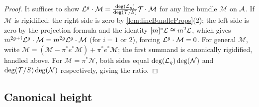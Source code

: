 \begin{proof}
  It suffices to show \(\mathcal{L}^g \cdot \mathcal{M} = \frac{\deg(\mathcal{L}_\eta)}{\deg(\mathcal{T}/S)} \mathcal{T} \cdot \mathcal{M}\)
  for any line bundle \(\mathcal{M}\) on \(\mathcal{A}\).
  If \(\mathcal{M}\) is rigidified: the right side is zero by \cref{lem:lineBundleProps}(2);
  the left side is zero by the projection formula and the identity
  \([m]^*\mathcal{L} \cong m^2\mathcal{L}\), which gives \(m^{2g+i}\mathcal{L}^g\cdot\mathcal{M} = m^{2g}\mathcal{L}^g\cdot\mathcal{M}\)
  (for \(i=1\) or \(2\)), forcing \(\mathcal{L}^g \cdot \mathcal{M}=0\).
  For general \(\mathcal{M}\), write \(\mathcal{M} = (\mathcal{M} - \pi^*e^*\mathcal{M}) + \pi^*e^*\mathcal{M}\);
  the first summand is canonically rigidified, handled above.
  For \(\mathcal{M} = \pi^*\mathcal{N}\), both sides equal \(\deg(\mathcal{L}_\eta)\deg(\mathcal{N})\) and
  \(\deg(\mathcal{T}/S)\deg(\mathcal{N})\) respectively, giving the ratio.
\end{proof}

\subsection{Canonical height}

